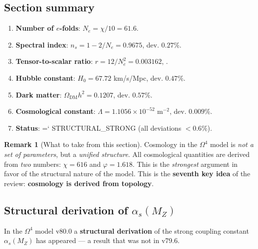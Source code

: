 \documentclass[11pt,a4paper]{article}
\newcommand{\Om}{\Omega^4}
\renewcommand{\texttt}[1]{{\ttfamily\hyphenchar\font=`\- #1}}
\theoremstyle{definition}
\newtheorem{remark}[theorem]{Remark}
\begin{document}
\subsection{Section summary}
\label{subsec:cosmology-summary}

\begin{enumerate}
    \item \textbf{Number of $e$-folds}: $N_e = \chi/10 = 61.6$.
    \item \textbf{Spectral index}: 
          $n_s = 1 - 2/N_e = 0.9675$, dev. $0.27\%$.
    \item \textbf{Tensor-to-scalar ratio}: 
          $r = 12/N_e^2 = 0.003162$, \checkmark.
    \item \textbf{Hubble constant}: 
          $H_0 = 67.72$ km/s/Mpc, dev. $0.47\%$.
    \item \textbf{Dark matter}: 
          $\Omega_{\text{DM}} h^2 = 0.1207$, dev. $0.57\%$.
    \item \textbf{Cosmological constant}: 
          $\Lambda = 1.1056 \times 10^{-52}$ m$^{-2}$, 
          dev. $0.009\%$.
    \item \textbf{Status}: \texttt{STRUCTURAL\_STRONG} 
          (all deviations $< 0.6\%$).
\end{enumerate}

\begin{remark}[What to take from this section]
\label{rem:cosmology-takeaway}
Cosmology in the $\Om$ model is \emph{not a set of parameters}, 
but a \emph{unified structure}. All cosmological quantities 
are derived from \emph{two} numbers: $\chi = 616$ and 
$\varphi = 1.618$. This is the \emph{strongest} argument in favor of 
the structural nature of the model. This is the \textbf{seventh key idea} 
of the review: \textbf{cosmology is derived from topology}.
\end{remark}

\subsection{Structural derivation of \texorpdfstring{$\alpha_s(M_Z)$}{alpha\_s(M\_Z)}}
\label{subsec:alphas-review}

In the $\Om$ model v80.0 a \textbf{structural derivation} of the 
strong coupling constant $\alpha_s(M_Z)$ has appeared — a result that 
was not in v79.6.
\end{document}
